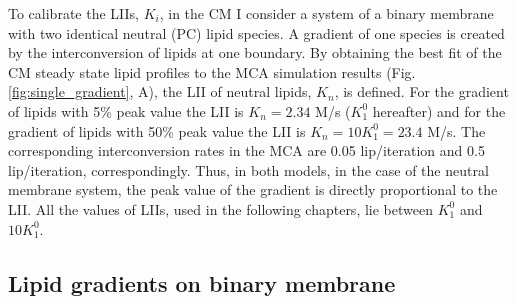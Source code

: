 To calibrate the LIIs, $K_i$, in the CM I consider a system of a binary membrane with two identical neutral (PC) lipid species. A gradient of one species is created by the interconversion of lipids at one boundary. By obtaining the best fit of the CM steady state lipid profiles to the MCA simulation results (Fig. \ref{fig:single_gradient}, A), the LII of neutral lipids, $K_n$, is defined. For the gradient of lipids with 5\% peak value the LII is $K_n=2.34$ M/s ($K^0_1$ hereafter) and for the gradient of lipids with 50\% peak value the LII is $K_n=10 K^0_1 = 23.4$ M/s. The corresponding interconversion rates in the MCA are 0.05 lip/iteration and 0.5 lip/iteration, correspondingly. Thus, in both models, in the case of the neutral membrane system, the peak value of the gradient is directly proportional to the LII. All the values of LIIs, used in the following chapters, lie between $K_1^0$ and $10 K_1^0$.

\subsection{Lipid gradients on binary membrane}
\label{chap:single_gradient}

